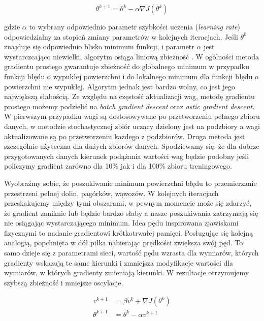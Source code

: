 \documentclass[11pt]{book}
\theoremstyle{definition}
\begin{document}
\begin{equation}
\theta^{k+1} = \theta^{k} - \alpha \nabla J(\theta^{k})
\end{equation}


gdzie $\alpha$ to wybrany odpowiednio parametr szybkości uczenia (\textit{learning rate}) odpowiedzialny za stopień zmiany parametrów w kolejnych iteracjach. Jeśli $\theta^0$ znajduje się odpowiednio blisko minimum funkcji, i parametr $\alpha$ jest wystarczcająco niewielki, algorytm osiąga liniową zbieżność \cite{Dennis:1996:NMU:1096889}. W ogólności metoda gradientu prostego gwarantuje zbieżność do globalnego minimum w przypadku funkcji błędu o wypukłej powierzchni i do lokalnego minimum dla funkcji błędu o powierzchni nie wypukłej. Algorytm jednak jest bardzo wolny, co jest jego największą słabością. Ze względu na częstość aktualizacji wag, metodę gradientu prostego możemy podzielić na \textit{batch gradient descent} oraz \textit{astic gradient descent}. W pierwszym przypadku wagi są dostosowywane po przetworzeniu pełnego zbioru danych, w metodzie stochastycznej zbiór uczący dzielony jest na podzbiory a wagi aktualizowane są po przetworzeniu każdego z podzbiorów. Druga metoda jest szczególnie użyteczna dla dużych zbiorów danych. Spodziewamy się, że dla dobrze przygotowanych danych kierunek podążania wartości wag będzie podobny jeśli policzymy gradient zarówno dla 10\% jak i dla 100\% zbioru treningowego.


Wyobraźmy sobie, że poszukiwanie minimum powierzchni błędu to przemierzanie przestrzeni pełnej dolin, pagórków, wąwozów. W kolejnych iteracjach przeskakujemy między tymi obszarami, w pewnym momencie może się zdarzyć, że gradient zaniknie lub będzie bardzo słaby a nasze poszukiwania zatrzymają się nie osiągając wystarczającego minimum. Idea pędu inspirowana zjawiskami fizycznymi to nadanie gradientowi krótkotrwałej pamięci. Posługując się kolejną analogią, popchnięta w dół piłka nabierając prędkości zwiększa swój pęd. To samo dzieje się z parametrami sieci, wartość pędu wzrasta dla wymiarów, których gradienty wskazują te same kierunki i zmniejsza modyfikacje wartości dla wymiarów, w których gradienty zmieniają kierunki. W rezultacje otrzymujemy szybszą zbieżność i mniejsze oscylacje.

\begin{align} 
v^{k+1} &=  \beta v^{k}+ \nabla J(\theta^{k}) \\[0.4em]
\theta^{k+1} &=  \theta^{k }- \alpha v^{k+1}
\end{align}
\end{document}
